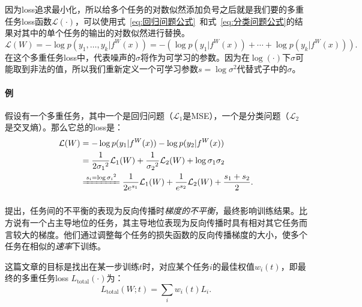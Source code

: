 \documentclass{ctexart}
\begin{document}
因为loss追求最小化，所以给多个任务的对数似然添加负号之后就是我们要的多重任务loss函数$\mathcal{L}(\cdot)$，可以使用式~\ref{eq:回归问题公式}~和式~\ref{eq:分类问题公式}的结果对其中的单个任务的输出的对数似然进行替换。
\begin{equation}
    \mathcal{L}(W) = - \log p(y_1, \ldots, y_k|f^W(x)) = - (\log p(y_1 | f^W(x)) + \cdots + \log p(y_k | f^W(x))).
\end{equation}
在这个多重任务loss中，代表噪声的$\sigma$将作为可学习的参数。因为在$\log(\cdot)$下$\sigma$可能取到非法的值，所以我们重新定义一个可学习参数$s=\log \sigma^2$代替式子中的$\sigma$。

\paragraph{例} 假设有一个多重任务，其中一个是回归问题（$\mathcal{L}_1$是MSE），一个是分类问题（$\mathcal{L}_2$是交叉熵）。那么它总的loss是：
\begin{equation}
    \begin{aligned}
        \mathcal{L}(W) &= - \log p(y_1|f^W(x)) - \log p(y_2|f^W(x)) \\
         &= \frac{1}{2{\sigma_1}^2} \mathcal{L}_1(W) + \frac{1}{{\sigma_2}^2} \mathcal{L}_2(W) + \log \sigma_1\sigma_2 \\
         &\xlongequal{s_i =\log {\sigma_i}^2} \frac{1}{2{e}^{s_1}} \mathcal{L}_1(W) + \frac{1}{{e}^{s_2}} \mathcal{L}_2(W) + \frac{s_1 + s_2}{2}.
    \end{aligned}
\end{equation}

\subsubsection{}

\citet{Chen18GradNorm}提出，任务间的不平衡的表现为反向传播时\emph{梯度的不平衡}，最终影响训练结果。比方说有一个占主导地位的任务，其主导地位表现为反向传播时具有相对其它任务而言较大的梯度。他们通过调整每个任务的损失函数的反向传播梯度的大小，使多个任务在相似的\emph{速率}下训练。

这篇文章的目标是找出在某一步训练$t$时，对应某个任务$i$的最佳权值$w_i(t)$，即最终的多重任务loss $L_\mathrm{total}(\cdot)$为：
\begin{equation}
    \label{eq:GradNormTotalLoss}
    L_\mathrm{total}(W;t) = \sum_i w_i(t) L_i.
\end{equation}
\end{document}

